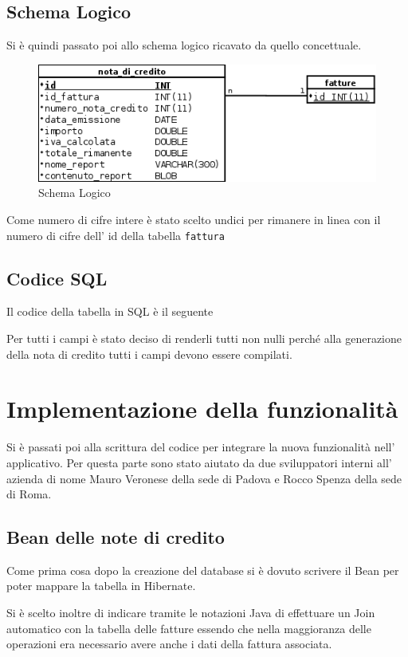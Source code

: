 \documentclass[12pt]{book}
\begin{document}
\subsection{Schema Logico}
Si è quindi passato poi allo schema logico ricavato da quello concettuale.
\begin{figure}[H]
    \centering
    \includegraphics[scale=0.5]{img/schema_logico}
    \caption{Schema Logico}\label{schema:logico}
\end{figure}
Come numero di cifre intere è stato scelto undici per rimanere in linea con il
numero di cifre dell' id della tabella \texttt{fattura}
\subsection{Codice SQL}
Il codice della tabella in SQL è il seguente

Per tutti i campi è stato deciso di renderli tutti non nulli perché alla
generazione della nota di credito tutti i campi devono essere compilati.
\section{Implementazione della funzionalità}
Si è passati poi alla scrittura del codice per integrare la nuova funzionalità
nell' applicativo.
Per questa parte sono stato aiutato da due sviluppatori interni all' azienda
di nome Mauro Veronese della sede di Padova e Rocco Spenza della sede di Roma.
\subsection{Bean delle note di credito}
Come prima cosa dopo la creazione del database si è dovuto scrivere il Bean per 
poter mappare la tabella in Hibernate.

Si è scelto inoltre di indicare tramite le notazioni Java di effettuare un Join
automatico con la tabella delle fatture essendo che nella maggioranza delle 
operazioni era necessario avere anche i dati della fattura associata.
\end{document}
